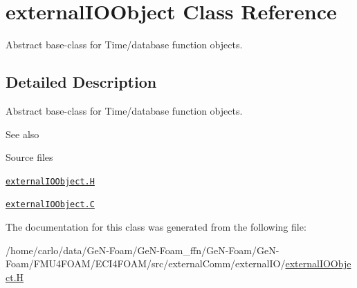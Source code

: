 \hypertarget{classFoam_1_1externalIOObject}{}\section{external\+I\+O\+Object Class Reference}
\label{classFoam_1_1externalIOObject}


Abstract base-\/class for Time/database function objects.  




\subsection{Detailed Description}
Abstract base-\/class for Time/database function objects. 

\label{_Description}%
 \begin{DoxySeeAlso}{See also}

\end{DoxySeeAlso}
\begin{DoxyParagraph}{Source files}

\begin{DoxyItemize}
\item \href{../../../home/carlo/data/GeN-Foam/GeN-Foam_ffn/GeN-Foam/GeN-Foam/FMU4FOAM/ECI4FOAM/src/externalComm/externalIO/externalIOObject.H}{\tt external\+I\+O\+Object.\+H} 
\item \href{../../../home/carlo/data/GeN-Foam/GeN-Foam_ffn/GeN-Foam/GeN-Foam/FMU4FOAM/ECI4FOAM/src/externalComm/externalIO/externalIOObject.C}{\tt external\+I\+O\+Object.\+C} 
\end{DoxyItemize}
\end{DoxyParagraph}


The documentation for this class was generated from the following file\+:\begin{DoxyCompactItemize}
\item 
/home/carlo/data/\+Ge\+N-\/\+Foam/\+Ge\+N-\/\+Foam\+\_\+ffn/\+Ge\+N-\/\+Foam/\+Ge\+N-\/\+Foam/\+F\+M\+U4\+F\+O\+A\+M/\+E\+C\+I4\+F\+O\+A\+M/src/external\+Comm/external\+I\+O/\hyperlink{externalIOObject_8H}{external\+I\+O\+Object.\+H}\end{DoxyCompactItemize}
